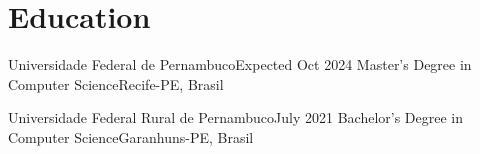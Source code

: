 \section{Education}
    \resumeSubHeadingListStart

    \resumeSubheading
    {Universidade Federal de Pernambuco}{Expected Oct 2024}
    {Master's Degree in Computer Science}{Recife-PE, Brasil}

    \resumeSubheading
    {Universidade Federal Rural de Pernambuco}{July 2021}
    {Bachelor's Degree in Computer Science}{Garanhuns-PE, Brasil}
    \resumeItemListStart
    \resumeItemListEnd

    \resumeSubHeadingListEnd